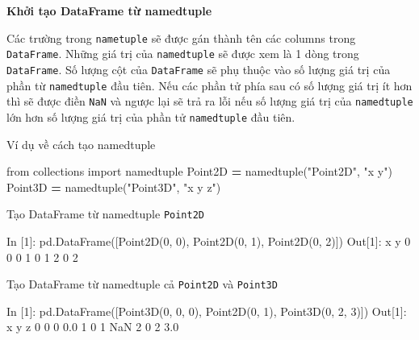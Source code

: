 \documentclass[
]{book}
\newenvironment{Shaded}{\begin{snugshade}}{\end{snugshade}}
\newcommand{\DecValTok}[1]{\textcolor[rgb]{0.00,0.00,0.81}{#1}}
\newcommand{\FloatTok}[1]{\textcolor[rgb]{0.00,0.00,0.81}{#1}}
\newcommand{\ImportTok}[1]{#1}
\newcommand{\NormalTok}[1]{#1}
\newcommand{\OperatorTok}[1]{\textcolor[rgb]{0.81,0.36,0.00}{\textbf{#1}}}
\newcommand{\StringTok}[1]{\textcolor[rgb]{0.31,0.60,0.02}{#1}}
\begin{document}
\textbf{Khởi tạo DataFrame từ namedtuple}

Các trường trong \texttt{nametuple} sẽ được gán thành tên các columns trong \texttt{DataFrame}. Những giá trị của \texttt{namedtuple} sẽ được xem là 1 dòng trong \texttt{DataFrame}.
Số lượng cột của \texttt{DataFrame} sẽ phụ thuộc vào số lượng giá trị của phần từ \texttt{namedtuple} đầu tiên. Nếu các phần tử phía sau có số lượng giá trị ít hơn thì
sẽ được điền \texttt{NaN} và ngược lại sẽ trả ra lỗi nếu số lượng giá trị của \texttt{namedtuple} lớn hơn số lượng giá trị của phần tử \texttt{namedtuple} đầu tiên.

Ví dụ về cách tạo namedtuple

\begin{Shaded}
\begin{Highlighting}[]
\ImportTok{from}\NormalTok{ collections }\ImportTok{import}\NormalTok{ namedtuple}
\NormalTok{Point2D }\OperatorTok{=}\NormalTok{ namedtuple(}\StringTok{"Point2D"}\NormalTok{, }\StringTok{"x y"}\NormalTok{)}
\NormalTok{Point3D }\OperatorTok{=}\NormalTok{ namedtuple(}\StringTok{"Point3D"}\NormalTok{, }\StringTok{"x y z"}\NormalTok{)}
\end{Highlighting}
\end{Shaded}

Tạo DataFrame từ namedtuple \texttt{Point2D}

\begin{Shaded}
\begin{Highlighting}[]
\NormalTok{In [}\DecValTok{1}\NormalTok{]: pd.DataFrame([Point2D(}\DecValTok{0}\NormalTok{, }\DecValTok{0}\NormalTok{), Point2D(}\DecValTok{0}\NormalTok{, }\DecValTok{1}\NormalTok{), Point2D(}\DecValTok{0}\NormalTok{, }\DecValTok{2}\NormalTok{)])}
\NormalTok{Out[}\DecValTok{1}\NormalTok{]:}
\NormalTok{   x  y}
\DecValTok{0}  \DecValTok{0}  \DecValTok{0}
\DecValTok{1}  \DecValTok{0}  \DecValTok{1}
\DecValTok{2}  \DecValTok{0}  \DecValTok{2}
\end{Highlighting}
\end{Shaded}

Tạo DataFrame từ namedtuple cả \texttt{Point2D} và \texttt{Point3D}

\begin{Shaded}
\begin{Highlighting}[]
\NormalTok{In [}\DecValTok{1}\NormalTok{]: pd.DataFrame([Point3D(}\DecValTok{0}\NormalTok{, }\DecValTok{0}\NormalTok{, }\DecValTok{0}\NormalTok{), Point2D(}\DecValTok{0}\NormalTok{, }\DecValTok{1}\NormalTok{), Point3D(}\DecValTok{0}\NormalTok{, }\DecValTok{2}\NormalTok{, }\DecValTok{3}\NormalTok{)])}
\NormalTok{Out[}\DecValTok{1}\NormalTok{]:    }
\NormalTok{   x  y    z}
\DecValTok{0}  \DecValTok{0}  \DecValTok{0}  \FloatTok{0.0}
\DecValTok{1}  \DecValTok{0}  \DecValTok{1}\NormalTok{  NaN}
\DecValTok{2}  \DecValTok{0}  \DecValTok{2}  \FloatTok{3.0}
\end{Highlighting}
\end{Shaded}
\end{document}
